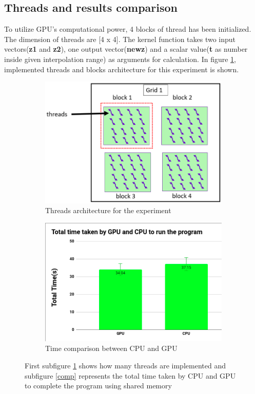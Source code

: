 \documentclass[11pt]{article}       %
\begin{document}
\subsection{Threads and results comparison } \label{vec}
To utilize GPU's computational power, 4 blocks of thread has been initialized. The dimension of threads are [4 x 4]. The kernel function takes two input vectors(\textbf{z1} and \textbf{z2}), one output vector(\textbf{newz}) and a scalar value(\textbf{t} as number inside given interpolation range) as arguments for calculation. In figure \ref{threadfig}, implemented threads and blocks architecture for this experiment is shown.

\begin{figure}[h]
\centering
\begin{subfigure}{.5\textwidth}
  \centering
  \includegraphics[width=0.9\linewidth]{par.png}
  \caption{Threads architecture for the experiment}\label{threadfig}
\end{subfigure}%
\begin{subfigure}{.5\textwidth}
  \centering
  \includegraphics[width=0.9\linewidth]{cpu-gpu.png}
  \caption{Time comparison between CPU and GPU}\label{comp}
  \label{fig:sub2}
\end{subfigure}
\caption{First subfigure \ref{threadfig} shows how many threads are implemented and subfigure \ref{comp} represents the total time taken by CPU and GPU to complete the program using shared memory}\label{fig:test}
\end{figure}
\end{document}
